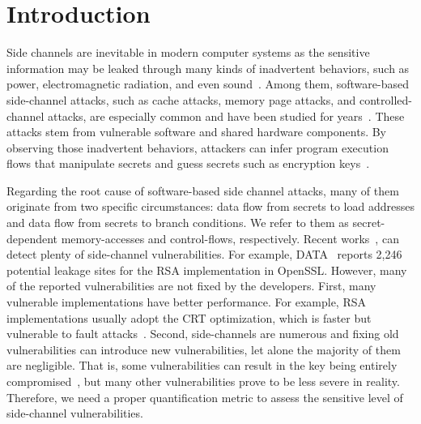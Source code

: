 \section{Introduction} 
Side channels are inevitable in modern computer systems as the sensitive
information may be leaked through many kinds of inadvertent behaviors, such as power,
electromagnetic radiation, and even
sound~\cite{agrawal2002side,kar20178,chari1999towards,217605,genkin2014rsa}.
Among them, software-based side-channel attacks, such as cache attacks, memory page
attacks, and controlled-channel attacks, are especially common and have been
studied for
years~\cite{7163052,217543,217589,lee2017inferring,191010,liu2015last}. These
attacks stem from vulnerable software and shared hardware components.
By observing those inadvertent behaviors, attackers can infer program
execution flows that manipulate secrets and guess secrets such as encryption
keys~\cite{Osvik2006,Gullasch:2011:CGB:2006077.2006784,203878,10.1007/978-3-540-45238-6_6}.


Regarding the root cause of software-based side channel attacks, many of them originate
from two specific circumstances: data flow from secrets to load
addresses and data flow from secrets to branch conditions. We refer to them as
secret-dependent memory-accesses and control-flows, respectively. 
Recent
works~\cite{203878,217537,Wichelmann:2018:MFF:3274694.3274741,Brotzman19Casym,236338,182946},
can detect plenty of side-channel vulnerabilities. For example,
DATA~\cite{217537} reports 2,246 potential leakage sites for the RSA
implementation in OpenSSL\@. 
However, many of the reported vulnerabilities are not fixed by the developers.
First, many vulnerable implementations have better performance. For example,
RSA implementations usually adopt the CRT optimization,
which is faster but vulnerable to fault attacks~\cite{aumuller2002fault}.
Second, side-channels are numerous and fixing old vulnerabilities can introduce new 
vulnerabilities,
let alone the majority of them are negligible. 
That is, some vulnerabilities can result in the key being 
entirely compromised~\cite{184415, aumuller2002fault}, 
but many other vulnerabilities prove to be less
severe in reality. Therefore, we need a proper quantification metric to 
assess the sensitive level of side-channel vulnerabilities.

